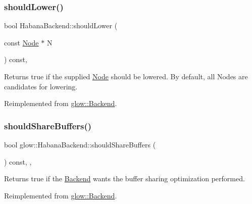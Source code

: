 \subsubsection{\texorpdfstring{should\+Lower()}{shouldLower()}}
{\footnotesize\ttfamily bool Habana\+Backend\+::should\+Lower (\begin{DoxyParamCaption}\item[{const \hyperlink{classglow_1_1_node}{Node} $\ast$}]{N }\end{DoxyParamCaption}) const\hspace{0.3cm}{\ttfamily [override]}, {\ttfamily [virtual]}}

\begin{DoxyReturn}{Returns}
true if the supplied \hyperlink{classglow_1_1_node}{Node}  should be lowered. By default, all Nodes are candidates for lowering. 
\end{DoxyReturn}


Reimplemented from \hyperlink{classglow_1_1_backend_aba5bec08f5e60626bcc5238f410d632a}{glow\+::\+Backend}.

\mbox{\label{classglow_1_1_habana_backend_a15199d7d7f6890963f2b8471095d0145}} 
\subsubsection{\texorpdfstring{should\+Share\+Buffers()}{shouldShareBuffers()}}
{\footnotesize\ttfamily bool glow\+::\+Habana\+Backend\+::should\+Share\+Buffers (\begin{DoxyParamCaption}{ }\end{DoxyParamCaption}) const\hspace{0.3cm}{\ttfamily [inline]}, {\ttfamily [override]}, {\ttfamily [virtual]}}

\begin{DoxyReturn}{Returns}
true if the \hyperlink{classglow_1_1_backend}{Backend} wants the buffer sharing optimization performed. 
\end{DoxyReturn}


Reimplemented from \hyperlink{classglow_1_1_backend_a5314d00d2739dca36279cd70b4a01145}{glow\+::\+Backend}.

\mbox{\label{classglow_1_1_habana_backend_ac6a97ec29cff4ba43e1d459450e9d175}} 
